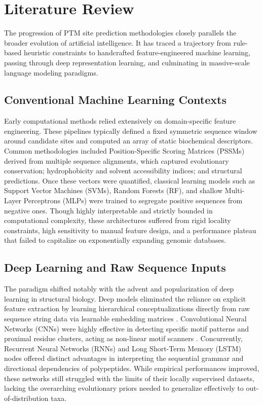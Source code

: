\documentclass[conference]{IEEEtran}
\begin{document}
\section{Literature Review}

The progression of PTM site prediction methodologies closely parallels the broader evolution of artificial intelligence. It has traced a trajectory from rule-based heuristic constraints to handcrafted feature-engineered machine learning, passing through deep representation learning, and culminating in massive-scale language modeling paradigms. 

\subsection{Conventional Machine Learning Contexts}
Early computational methods relied extensively on domain-specific feature engineering. These pipelines typically defined a fixed symmetric sequence window around candidate sites and computed an array of static biochemical descriptors. Common methodologies included Position-Specific Scoring Matrices (PSSMs) derived from multiple sequence alignments, which captured evolutionary conservation; hydrophobicity and solvent accessibility indices; and structural predictions. Once these vectors were quantified, classical learning models such as Support Vector Machines (SVMs), Random Forests (RF), and shallow Multi-Layer Perceptrons (MLPs) were trained to segregate positive sequences from negative ones. Though highly interpretable and strictly bounded in computational complexity, these architectures suffered from rigid locality constraints, high sensitivity to manual feature design, and a performance plateau that failed to capitalize on exponentially expanding genomic databases.

\subsection{Deep Learning and Raw Sequence Inputs}
The paradigm shifted notably with the advent and popularization of deep learning in structural biology. Deep models eliminated the reliance on explicit feature extraction by learning hierarchical conceptualizations directly from raw sequence string data via learnable embedding matrices \cite{wang2017musitedeep}. Convolutional Neural Networks (CNNs) were highly effective in detecting specific motif patterns and proximal residue clusters, acting as non-linear motif scanners \cite{fu2019deepubi}. Concurrently, Recurrent Neural Networks (RNNs) and Long Short-Term Memory (LSTM) nodes offered distinct advantages in interpreting the sequential grammar and directional dependencies of polypeptides. While empirical performances improved, these networks still struggled with the limits of their locally supervised datasets, lacking the overarching evolutionary priors needed to generalize effectively to out-of-distribution taxa.
\end{document}
